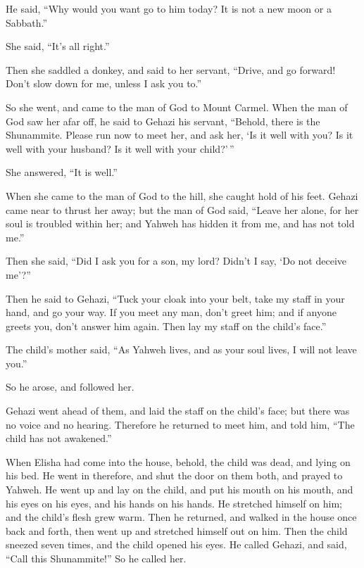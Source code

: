  He said, ``Why would you want go to him today? It is not a
new moon or a Sabbath.''

She said, ``It's all right.''

 Then she saddled a donkey, and said to her servant,
``Drive, and go forward! Don't slow down for me, unless I ask you to.''

 So she went, and came to the man of God to Mount Carmel.
When the man of God saw her afar off, he said to Gehazi his servant,
``Behold, there is the Shunammite.  Please run now to meet
her, and ask her, `Is it well with you? Is it well with your husband? Is
it well with your child?'\,''

She answered, ``It is well.''

 When she came to the man of God to the hill, she caught
hold of his feet. Gehazi came near to thrust her away; but the man of
God said, ``Leave her alone, for her soul is troubled within her; and
Yahweh has hidden it from me, and has not told me.''

 Then she said, ``Did I ask you for a son, my lord? Didn't
I say, `Do not deceive me'?''

 Then he said to Gehazi, ``Tuck your cloak into your belt,
take my staff in your hand, and go your way. If you meet any man, don't
greet him; and if anyone greets you, don't answer him again. Then lay my
staff on the child's face.''

 The child's mother said, ``As Yahweh lives, and as your
soul lives, I will not leave you.''

So he arose, and followed her.

 Gehazi went ahead of them, and laid the staff on the
child's face; but there was no voice and no hearing. Therefore he
returned to meet him, and told him, ``The child has not awakened.''

 When Elisha had come into the house, behold, the child was
dead, and lying on his bed.  He went in therefore, and shut
the door on them both, and prayed to Yahweh.  He went up
and lay on the child, and put his mouth on his mouth, and his eyes on
his eyes, and his hands on his hands. He stretched himself on him; and
the child's flesh grew warm.  Then he returned, and walked
in the house once back and forth, then went up and stretched himself out
on him. Then the child sneezed seven times, and the child opened his
eyes.  He called Gehazi, and said, ``Call this
Shunammite!'' So he called her.

